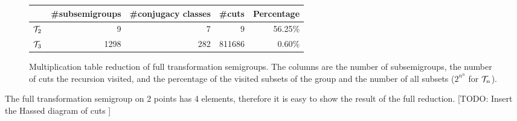 \documentclass{article}
\theoremstyle{plain}
\theoremstyle{definition}
\newcommand{\cT}{{\cal T}}
\newcommand{\todo}[1]{ \small \textsf{[TODO:  #1 ]} \normalsize}
\begin{document}
\begin{figure}
\begin{center}
\begin{tabular}{|l|r|r|r|r|}\hline
 & \#subsemigroups & \#conjugacy classes &\#cuts & Percentage\\
\hline
$\cT_2$ & 9 & 7 & 9 & 56.25\% \\
\hline
$\cT_3$ & 1298 & 282 &  811686 & 0.60\% \\
\hline
\end{tabular}
\end{center}
\caption{Multiplication table reduction of full transformation semigroups. The columns are the number of subsemigroups, the number of cuts the recursion visited, and the percentage of the visited subsets of the group and the number of all subsets ($2^{n^n}$ for $\cT_n$).}
\end{figure}

The full transformation semigroup on 2 points has 4 elements, therefore it is easy to show the result of the full reduction. \todo{Insert the Hassed diagram of cuts}
\end{document}
